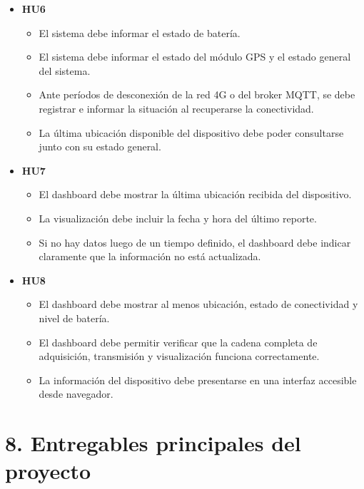 \documentclass[
11pt, %
]{charter}
\begin{document}
\begin{itemize}
\begin{itemize}
		\item El prototipo debe operar durante el período mínimo de autonomía definido para la prueba de campo.
		\item El sistema debe alimentarse únicamente desde la batería prevista durante la prueba de autonomía, partiendo de un estado con 100\% de carga.
		\item Durante la prueba no deben producirse reinicios inesperados ni pérdida total de funcionalidad.
	\end{itemize}
	\item \textbf{HU6}
	\begin{itemize}
		\item El sistema debe informar el estado de batería.
		\item El sistema debe informar el estado del módulo GPS y el estado general del sistema.
		\item Ante períodos de desconexión de la red 4G o del broker MQTT, se debe registrar e informar la situación al recuperarse la conectividad.
		\item La última ubicación disponible del dispositivo debe poder consultarse junto con su estado general.
	\end{itemize}
	\item \textbf{HU7}
	\begin{itemize}
		\item El dashboard debe mostrar la última ubicación recibida del dispositivo.
		\item La visualización debe incluir la fecha y hora del último reporte.
		\item Si no hay datos luego de un tiempo definido, el dashboard debe indicar claramente que la información no está actualizada.
	\end{itemize}
	\item \textbf{HU8}
	\begin{itemize}
		\item El dashboard debe mostrar al menos ubicación, estado de conectividad y nivel de batería.
		\item El dashboard debe permitir verificar que la cadena completa de adquisición, transmisión y visualización funciona correctamente.
		\item La información del dispositivo debe presentarse en una interfaz accesible desde navegador.
	\end{itemize}
\end{itemize}


\section{8. Entregables principales del proyecto}
\label{sec:entregables}
\end{document}
